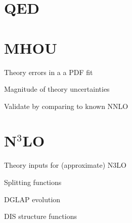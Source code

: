 \documentclass[aspectratio=169, 8pt,t]{beamer}
\begin{document}
\section{QED}

\section{MHOU}

\begin{frame}{Theory errors in a a PDF fit}
\end{frame}

\begin{frame}{Magnitude of theory uncertainties}
\end{frame}

\begin{frame}{Validate by comparing to known NNLO}
\end{frame}

\section{N$^3$LO}

\begin{frame}{Theory inputs for (approximate) N3LO}
\end{frame}


\begin{frame}{Splitting functions}
\end{frame}


\begin{frame}{DGLAP evolution}
\end{frame}


\begin{frame}{DIS structure functions}
\end{frame}
\end{document}
